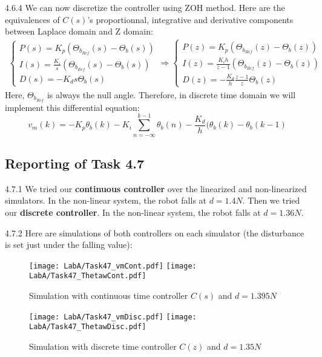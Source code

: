 \documentclass[11pt]{article}
\begin{document}
4.6.4 We can now discretize the controller using ZOH method. Here are the equivalences of $C(s)$'s proportionnal, integrative and derivative components between Laplace domain and Z domain:
\begin{align*}
\begin{cases}
P(s)=K_p(\Theta_{b_{Ref}}(s)-\Theta_b(s)) \\
I(s)=\frac{K_i}{s}(\Theta_{b_{Ref}}(s)-\Theta_b(s)) \\
D(s)=-K_ds\Theta_b(s)
\end{cases}
\Rightarrow
\begin{cases}
P(z)=K_p(\Theta_{b_{Ref}}(z)-\Theta_b(z)) \\
I(z)=\frac{K_ih}{z-1}(\Theta_{b_{Ref}}(z)-\Theta_b(z)) \\
D(z)=-\frac{K_d}{h}\frac{z-1}{z}\Theta_b(z)
\end{cases}
\end{align*}
Here, $\Theta_{b_{Ref}}$ is always the null angle.
Therefore, in discrete time domain we will implement this differential equation:
\begin{equation*}
v_m(k)=-K_p\theta_b(k) -K_i\sum\limits_{n = - \infty }^{k-1}{\theta_b(n)} - \frac{K_d}{h}(\theta_b(k)-\theta_b(k-1)
\end{equation*}


\subsection*{Reporting of Task 4.7}
4.7.1 We tried our \textbf{continuous controller} over the linearized and non-linearized simulators. In the non-linear system, the robot falls at $d=1.4N$.
Then we tried our \textbf{discrete controller}. In the non-linear system, the robot falls at $d=1.36N$.

4.7.2 Here are simulations of both controllers on each simulator (the disturbance is set just under the falling value):
\begin{figure}[H]
  \texttt{[image: LabA/Task47\_vmCont.pdf]}
  \texttt{[image: LabA/Task47\_ThetawCont.pdf]}
  \caption{Simulation with continuous time controller $C(s)$ and $d=1.395N$}
  \label{fig:fig5}
\end{figure}
\begin{figure}[H]
  \texttt{[image: LabA/Task47\_vmDisc.pdf]}
  \texttt{[image: LabA/Task47\_ThetawDisc.pdf]}
  \caption{Simulation with discrete time controller $C(z)$ and $d=1.35N$}
  \label{fig:fig6}
\end{figure}
\end{document}

